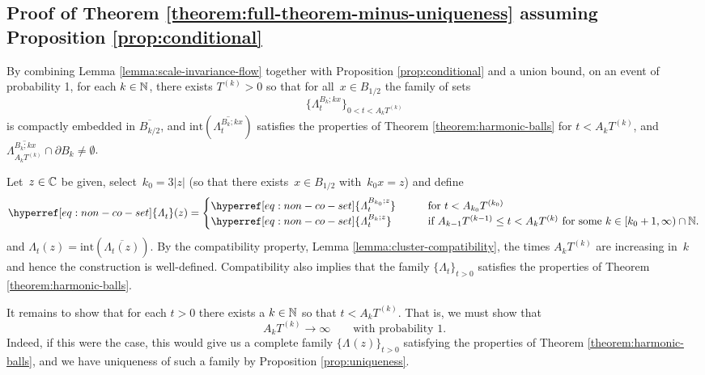 \documentclass[12pt]{amsart}
\numberwithin{equation}{section}
\newcommand{\cluster}[2]{\hyperref[eq:non-co-set]{\mathit{\Lambda}^{#1}_{#2}}}
\newcommand{\regcluster}[2]{\hyperref[eq:regular-cluster]{\Lambda^{#1}_{#2}}}
\begin{document}
	\subsection{Proof of Theorem \ref{theorem:full-theorem-minus-uniqueness} assuming Proposition \ref{prop:conditional}}
	By combining Lemma \ref{lemma:scale-invariance-flow} together with Proposition \ref{prop:conditional} and a union bound, 
	on an event of probability 1, for each $k \in \mathbb{N}$, there exists $T^{(k)} > 0$ so that for all~$x \in B_{1/2}$ the family of sets
	\begin{equation}
	\{\cluster{B_k; k x}{t}\}_{0 < t < A_k T^{(k)}}
	\end{equation}
	is compactly embedded in $\overline{B_{k/2}}$, and $\mathrm{int}(\overline{\cluster{B_k; k x}{t}})$ satisfies the properties of Theorem \ref{theorem:harmonic-balls} for $t < A_k T^{(k)}$,
	and $\overline{\cluster{B_k; k x}{A_k T^{(k)}}} \cap \partial B_k \neq \emptyset$. 
	
	Let~$z \in \mathbb{C}$ be given, select~$k_0 = 3 |z|$ (so that there exists~$x \in B_{1/2}$ with~$k_0 x = z$) and define 
	\begin{equation}
	{\cluster{}{t}}(z)  = \begin{cases}
	\cluster{B_{k_0}; z}{t} \qquad &\mbox{for $t < A_{k_0} T^{(k_0)}$} \\
	\cluster{B_k; z}{t} \qquad &\mbox{if $A_{k-1} T^{(k-1)} \leq t < A_{k} T^{(k)}$ for some $k \in [k_0 + 1, \infty) \cap \N$}.
	\end{cases}
	\end{equation}
	and ${\regcluster{}{t}(z)} = \mathrm{int}(\overline{\cluster{}{t}(z)})$.
	By the compatibility property, Lemma \ref{lemma:cluster-compatibility}, the times $A_k T^{(k)}$ are increasing in~$k$
	and hence the construction is well-defined. 
	Compatibility also implies that the family $\{{\regcluster{}{t}}\}_{t > 0}$ satisfies the properties of Theorem \ref{theorem:harmonic-balls}. 
	
	It remains to show that for each $t > 0$ there exists a $k \in \mathbb{N}$ so that $t < A_{k} T^{(k)}$.
	That is, we must show that
	\begin{equation} \label{eq:strictly-increasing-times}
	A_{k} T^{(k)} \to \infty \qquad \mbox{with probability 1}.
	\end{equation}
	Indeed, if this were the case, this would give us a complete family $\{\regcluster{}{}(z)\}_{t > 0}$ satisfying the properties of Theorem \ref{theorem:harmonic-balls}, and we have uniqueness of such a family by Proposition \ref{prop:uniqueness}.
	
\end{document}
